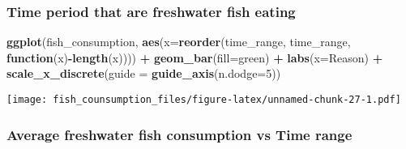 \documentclass[
]{article}
\newenvironment{Shaded}{\begin{snugshade}}{\end{snugshade}}
\newcommand{\AttributeTok}[1]{\textcolor[rgb]{0.13,0.29,0.53}{#1}}
\newcommand{\ControlFlowTok}[1]{\textcolor[rgb]{0.13,0.29,0.53}{\textbf{#1}}}
\newcommand{\DecValTok}[1]{\textcolor[rgb]{0.00,0.00,0.81}{#1}}
\newcommand{\FunctionTok}[1]{\textcolor[rgb]{0.13,0.29,0.53}{\textbf{#1}}}
\newcommand{\NormalTok}[1]{#1}
\newcommand{\OtherTok}[1]{\textcolor[rgb]{0.56,0.35,0.01}{#1}}
\newcommand{\SpecialCharTok}[1]{\textcolor[rgb]{0.81,0.36,0.00}{\textbf{#1}}}
\newcommand{\StringTok}[1]{\textcolor[rgb]{0.31,0.60,0.02}{#1}}
\begin{document}
\hypertarget{time-period-that-are-freshwater-fish-eating}{%
\subsubsection{Time period that are freshwater fish
eating}\label{time-period-that-are-freshwater-fish-eating}}

\begin{Shaded}
\begin{Highlighting}[]
\FunctionTok{ggplot}\NormalTok{(fish\_consumption, }\FunctionTok{aes}\NormalTok{(}\AttributeTok{x=}\FunctionTok{reorder}\NormalTok{(time\_range, time\_range, }\ControlFlowTok{function}\NormalTok{(x)}\SpecialCharTok{{-}}\FunctionTok{length}\NormalTok{(x)))) }\SpecialCharTok{+}
  \FunctionTok{geom\_bar}\NormalTok{(}\AttributeTok{fill=}\StringTok{\textquotesingle{}green\textquotesingle{}}\NormalTok{) }\SpecialCharTok{+} 
  \FunctionTok{labs}\NormalTok{(}\AttributeTok{x=}\StringTok{\textquotesingle{}Reason\textquotesingle{}}\NormalTok{) }\SpecialCharTok{+}
  \FunctionTok{scale\_x\_discrete}\NormalTok{(}\AttributeTok{guide =} \FunctionTok{guide\_axis}\NormalTok{(}\AttributeTok{n.dodge=}\DecValTok{5}\NormalTok{))}
\end{Highlighting}
\end{Shaded}

\texttt{[image: fish\_counsumption\_files/figure-latex/unnamed-chunk-27-1.pdf]}

\hypertarget{average-freshwater-fish-consumption-vs-time-range}{%
\subsubsection{Average freshwater fish consumption vs Time
range}\label{average-freshwater-fish-consumption-vs-time-range}}

\begin{Shaded}
\end{Shaded}
\end{document}
